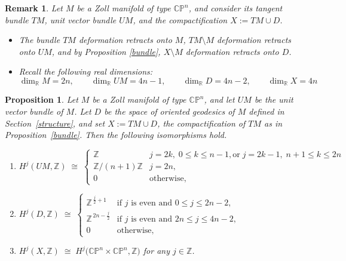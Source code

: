 \documentclass[a4paper, 12pt]{article}
\newcommand{\oX}{X}
\newcommand{\bC}{\mathbb{C}}
\newcommand{\bZ}{\mathbb{Z}}
\newcommand{\bR}{\mathbb{R}}
\newcommand{\bCP}{\mathbb{CP}^n}
\newtheorem{prop}[thm]{Proposition}
\newtheorem{rem}[thm]{Remark}
\begin{document}
\begin{rem}\label{TopStructure}
Let $M$ be a Zoll manifold of type $\bCP$, and consider its tangent bundle $TM$, unit vector bundle $UM$,
and the compactification $X := TM \cup D$.
\begin{itemize}
\item The bundle $TM$ deformation retracts onto $M$, $TM \setminus M$ deformation retracts onto $UM$, and by Proposition \ref{bundle}, $X\setminus M$ deformation retracts onto $D$.
\item Recall the following real dimensions:
\[
\dim_\bR M = 2n, \qquad \dim_\bR UM = 4n-1, \qquad \dim_\bR D = 4n-2, \qquad \dim_\bR X = 4n
\]
\end{itemize}
\end{rem}


\begin{prop}\label{cohom}
\noindent
Let $M$ be a Zoll manifold of type $\bCP$, and let $UM$ be the unit vector bundle of $M$. Let $D$ be the space of oriented geodesics of $M$ defined in Section~\ref{structure}, and set $X := TM \cup D$, the compactification of $TM$ as in Proposition~\ref{bundle}. Then the following isomorphisms hold.
\begin{enumerate}
\item 
$H^j(UM,\bZ)\;\cong\;
\begin{cases}
\bZ & j=2k,\;0 \leq k \leq n-1, \text{or}\;j=2k-1,\;n+1\leq k\leq 2n\\
\bZ/(n+1)\bZ & j=2n,\\
0 & \text{otherwise},
\end{cases}$

\item 
$H^j(D,\bZ)\;\cong\;
\begin{cases}
\bZ^{\,\frac{j}{2}+1} & \text{if $j$ is even and } 0 \leq j \leq 2n-2,\\
\bZ^{\,2n-\frac{j}{2}} & \text{if $j$ is even and } 2n \leq j \leq 4n-2,\\
0 & \text{otherwise},
\end{cases}$

\item 
$H^j(\oX,\bZ)\;\cong\;H^j\bigl(\bCP\times\bCP,\bZ\bigr)$ for any $j\in \bZ$. 
\end{enumerate}
\end{prop}
\end{document}

